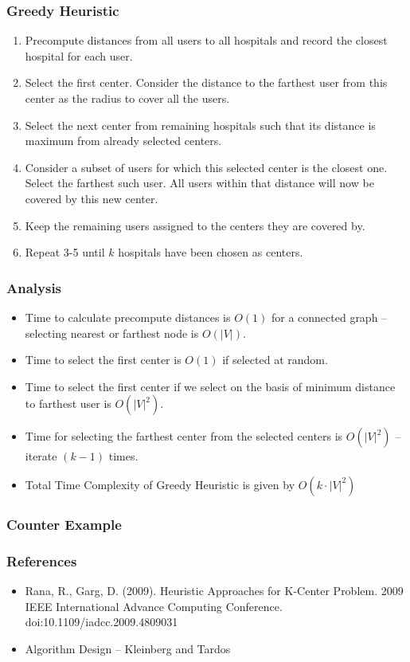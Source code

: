\documentclass{beamer}
\begin{document}
\begin{frame}
    \frametitle{Greedy Heuristic}
    
    \begin{enumerate}
        \item Precompute distances from all users to all hospitals and record the closest hospital for each user.
        \item Select the first center. Consider the distance to the farthest user from this center as the radius to cover all the users.
        \item Select the next center from remaining hospitals such that its distance is maximum from already selected centers.
        \item Consider a subset of users for which this selected center is the closest one. Select the farthest such user. All users within that distance will now be covered by this new center.
        \item Keep the remaining users assigned to the centers they are covered by.
        \item Repeat 3-5 until $k$ hospitals have been chosen as centers.
    \end{enumerate}
\end{frame}


\begin{frame}
    \frametitle{Analysis}
        
    \begin{itemize}
        \item Time to calculate precompute distances is $O(1)$ for a connected graph -- selecting nearest or farthest node is $O(|V|)$.
        \item Time to select the first center is $O(1)$ if selected at random.
        \item Time to select the first center if we select on the basis of minimum distance to farthest user is $O(|V|^2)$.
        \item Time for selecting the farthest center from the selected centers is $O(|V|^2)$ -- iterate $(k - 1)$ times.
        \item Total Time Complexity of Greedy Heuristic is given by $O(k \cdot|V|^2)$
    \end{itemize}
\end{frame}

\begin{frame}
\frametitle {Counter Example}
\end{frame}

\begin{frame}
    \frametitle{References}
    \begin{itemize}
        \item Rana, R., Garg, D. (2009). Heuristic Approaches for K-Center Problem. 2009 IEEE International Advance Computing Conference. doi:10.1109/iadcc.2009.4809031
        \item Algorithm Design -- Kleinberg and Tardos
    \end{itemize}
\end{frame}
\end{document}
